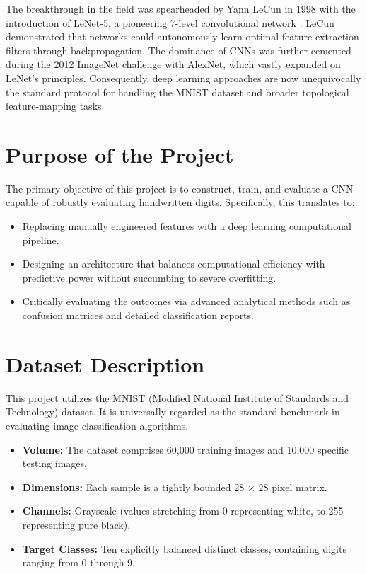 \documentclass[12pt,a4paper]{article}
\begin{document}
The breakthrough in the field was spearheaded by Yann LeCun in 1998 with the introduction of LeNet-5, a pioneering 7-level convolutional network \cite{lecun1998}. LeCun demonstrated that networks could autonomously learn optimal feature-extraction filters through backpropagation. The dominance of CNNs was further cemented during the 2012 ImageNet challenge with AlexNet, which vastly expanded on LeNet's principles. Consequently, deep learning approaches are now unequivocally the standard protocol for handling the MNIST dataset and broader topological feature-mapping tasks.

\section{Purpose of the Project}
The primary objective of this project is to construct, train, and evaluate a CNN capable of robustly evaluating handwritten digits. Specifically, this translates to:
\begin{itemize}
    \item Replacing manually engineered features with a deep learning computational pipeline.
    \item Designing an architecture that balances computational efficiency with predictive power without succumbing to severe overfitting.
    \item Critically evaluating the outcomes via advanced analytical methods such as confusion matrices and detailed classification reports.
\end{itemize}

\section{Dataset Description}
This project utilizes the MNIST (Modified National Institute of Standards and Technology) dataset. It is universally regarded as the standard benchmark in evaluating image classification algorithms. 

\begin{itemize}
    \item \textbf{Volume:} The dataset comprises 60,000 training images and 10,000 specific testing images.
    \item \textbf{Dimensions:} Each sample is a tightly bounded 28 $\times$ 28 pixel matrix.
    \item \textbf{Channels:} Grayscale (values stretching from 0 representing white, to 255 representing pure black).
    \item \textbf{Target Classes:} Ten explicitly balanced distinct classes, containing digits ranging from 0 through 9.
\end{itemize}
\end{document}
